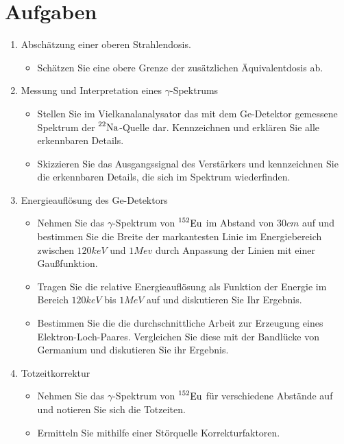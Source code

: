 \section{Aufgaben}
\label{sec:aufgaben}
	
	\begin{enumerate}
		\item Abschätzung einer oberen Strahlendosis.
			\begin{itemize}
				\item Schätzen Sie eine obere Grenze der zusätzlichen Äquivalentdosis ab.
			\end{itemize}
		\item Messung und Interpretation eines $\gamma$-Spektrums
			\begin{itemize}
				\item Stellen Sie im Vielkanalanalysator das mit dem Ge-Detektor gemessene Spektrum der $\prescript{22}{}{\mathrm{Na}}$-Quelle dar.
				Kennzeichnen und erklären Sie alle erkennbaren Details.
				\item Skizzieren Sie das Ausgangssignal des Verstärkers und kennzeichnen Sie die erkennbaren Details, die sich im Spektrum wiederfinden.
			\end{itemize}
		\item Energieauflösung des Ge-Detektors
			\begin{itemize}
				\item Nehmen Sie das $\gamma$-Spektrum von $\prescript{152}{}{\mathrm{Eu}}$ im Abstand von $30\unit{cm}$ auf und bestimmen Sie die Breite der markantesten Linie im Energiebereich zwischen $120\unit{keV}$ und $1\unit{Mev}$ durch Anpassung der Linien mit einer Gaußfunktion.
				\item Tragen Sie die relative Energieauflösung als Funktion der Energie im Bereich $120\unit{keV}$ bis $1\unit{MeV}$ auf und diskutieren Sie Ihr Ergebnis.
				\item Bestimmen Sie die die durchschnittliche Arbeit zur Erzeugung eines Elektron-Loch-Paares. Vergleichen Sie diese mit der Bandlücke von Germanium und diskutieren Sie ihr Ergebnis.
			\end{itemize}
		\item Totzeitkorrektur
			\begin{itemize}
				\item Nehmen Sie das $\gamma$-Spektrum von $\prescript{152}{}{\mathrm{Eu}}$ für verschiedene Abstände auf und notieren Sie sich die Totzeiten.
				\item Ermitteln Sie mithilfe einer Störquelle Korrekturfaktoren.

\end{itemize}
\end{enumerate}
